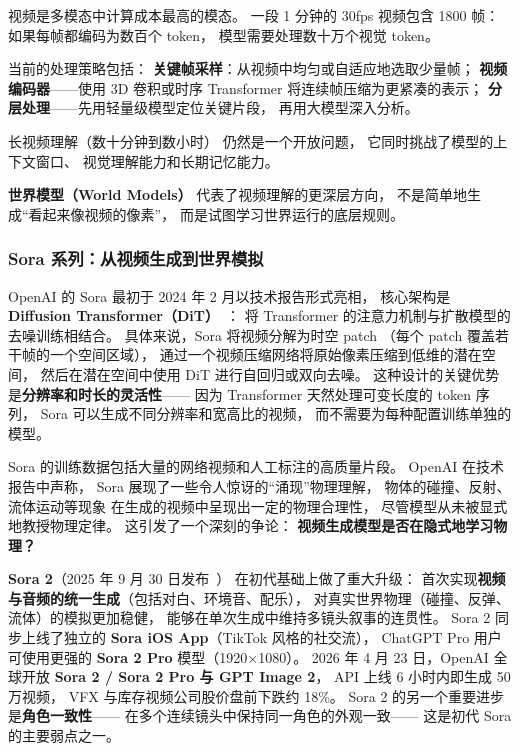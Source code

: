 视频是多模态中计算成本最高的模态。
一段 1 分钟的 30fps 视频包含 1800 帧：
如果每帧都编码为数百个 token，
模型需要处理数十万个视觉 token。

当前的处理策略包括：
\textbf{关键帧采样}：从视频中均匀或自适应地选取少量帧；
\textbf{视频编码器}——使用 3D 卷积或时序 Transformer
将连续帧压缩为更紧凑的表示；
\textbf{分层处理}——先用轻量级模型定位关键片段，
再用大模型深入分析。

长视频理解（数十分钟到数小时）
仍然是一个开放问题，
它同时挑战了模型的上下文窗口、
视觉理解能力和长期记忆能力。

\textbf{世界模型（World Models）}
代表了视频理解的更深层方向，
不是简单地生成“看起来像视频的像素”，
而是试图学习世界运行的底层规则。

\subsubsection{Sora 系列：从视频生成到世界模拟}

OpenAI 的 Sora 最初于 2024 年 2 月以技术报告形式亮相，
核心架构是 \textbf{Diffusion Transformer（DiT）}~\cite{peebles2023dit}：
将 Transformer 的注意力机制与扩散模型的去噪训练相结合。
具体来说，Sora 将视频分解为时空 patch
（每个 patch 覆盖若干帧的一个空间区域），
通过一个视频压缩网络将原始像素压缩到低维的潜在空间，
然后在潜在空间中使用 DiT 进行自回归或双向去噪。
这种设计的关键优势是\textbf{分辨率和时长的灵活性}——
因为 Transformer 天然处理可变长度的 token 序列，
Sora 可以生成不同分辨率和宽高比的视频，
而不需要为每种配置训练单独的模型。

Sora 的训练数据包括大量的网络视频和人工标注的高质量片段。
OpenAI 在技术报告中声称，
Sora 展现了一些令人惊讶的“涌现”物理理解，
物体的碰撞、反射、流体运动等现象
在生成的视频中呈现出一定的物理合理性，
尽管模型从未被显式地教授物理定律。
这引发了一个深刻的争论：
\textbf{视频生成模型是否在隐式地学习物理？}

\textbf{Sora 2}（2025 年 9 月 30 日发布~\cite{sora2_release_2025}）
在初代基础上做了重大升级：
首次实现\textbf{视频与音频的统一生成}（包括对白、环境音、配乐），
对真实世界物理（碰撞、反弹、流体）的模拟更加稳健，
能够在单次生成中维持多镜头叙事的连贯性。
Sora 2 同步上线了独立的 \textbf{Sora iOS App}（TikTok 风格的社交流），
ChatGPT Pro 用户可使用更强的 \textbf{Sora 2 Pro} 模型（1920$\times$1080）。
2026 年 4 月 23 日，OpenAI 全球开放 \textbf{Sora 2 / Sora 2 Pro 与 GPT Image 2}，
API 上线 6 小时内即生成 50 万视频，
VFX 与库存视频公司股价盘前下跌约 18\%。
Sora 2 的另一个重要进步是\textbf{角色一致性}——
在多个连续镜头中保持同一角色的外观一致——
这是初代 Sora 的主要弱点之一。


